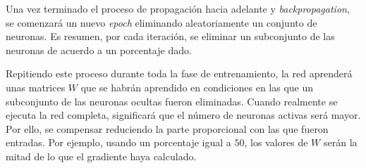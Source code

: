 \begin{itemize}
    Una vez terminado el proceso de propagación hacia adelante y \textit{backpropagation}, se comenzará un nuevo \textit{epoch} eliminando aleatoriamente un conjunto de neuronas. Es resumen, por cada iteración, se eliminar un subconjunto de las neuronas de acuerdo a un porcentaje dado.
    \newline
    
    Repitiendo este proceso durante toda la fase de entrenamiento, la red aprenderá unas matrices $W$ que se habrán aprendido en condiciones en las que un subconjunto de las neuronas ocultas fueron eliminadas. Cuando realmente se ejecuta la red completa, significará que el número de neuronas activas será mayor. Por ello, se compensar reduciendo la parte proporcional con las que fueron entradas. Por ejemplo, usando un porcentaje igual a $50$, los valores de $W$ serán la mitad de lo que el gradiente haya calculado.
    

\end{itemize}


